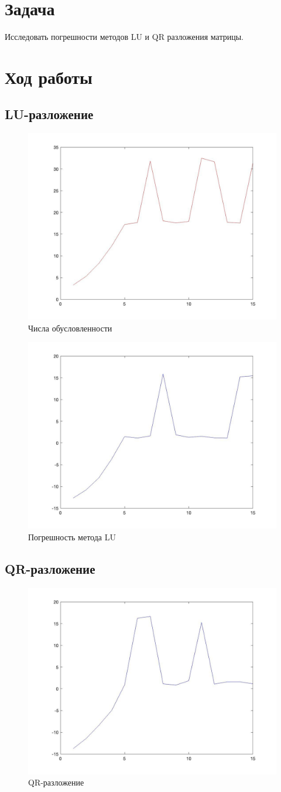 \documentclass[a4paper,12pt]{article}
\begin{document}
	
	\section{Задача}
		Исследовать погрешности методов LU и QR разложения матрицы.
	\section{Ход работы}
	\subsection{LU-разложение}
	
	\begin{figure}[H]
		\centering
		\includegraphics[width=0.5\linewidth]{polytech/calc-math/report-lab2/subfiles/lu2.jpg}
		\caption{Числа обусловленности}
		\label{fig:lu2}
	\end{figure}
	\begin{figure}[H]
		\centering
		\includegraphics[width=0.5\linewidth]{polytech/calc-math/report-lab2/subfiles/lu1.jpg}
		\caption{Погрешность метода LU}
		\label{fig:lu1}
	\end{figure}
	\subsection{QR-разложение}
	
	\begin{figure}[H]
		\centering
		\includegraphics[width=0.5\linewidth]{polytech/calc-math/report-lab2/subfiles/qr.jpg}
		\caption{QR-разложение}
		\label{fig:qr}
	\end{figure}
	
\end{document}
